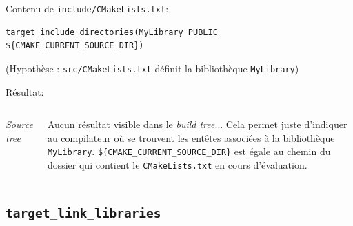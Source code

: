 \documentclass{beamer}
\newenvironment{Frame}{\begin{frame}[containsverbatim]{\subsecname}}{\end{frame}}
\begin{document}
\begin{Frame}
    \setlength{\DTbaselineskip}{0.8em}
    Contenu de \texttt{include/CMakeLists.txt}:
    
    \footnotesize
    \begin{verbatim}
target_include_directories(MyLibrary PUBLIC ${CMAKE_CURRENT_SOURCE_DIR})
    \end{verbatim}
    
    (Hypothèse : \texttt{src/CMakeLists.txt} définit la bibliothèque \verb|MyLibrary|)
    
    \normalsize
    Résultat:
    \begin{columns}
        \begin{center}   
            \textit{Source tree}
        \end{center}
        \footnotesize

        Aucun résultat visible dans le \textit{build tree}... Cela permet juste d'indiquer au compilateur où se trouvent les entêtes associées à la bibliothèque \verb|MyLibrary|.
        \verb|${CMAKE_CURRENT_SOURCE_DIR}| est égale au chemin du dossier qui contient le \verb|CMakeLists.txt| en cours d'évaluation.
    \end{columns}
\end{Frame}

\subsection{\texttt{target\_link\_libraries}}
\end{document}
